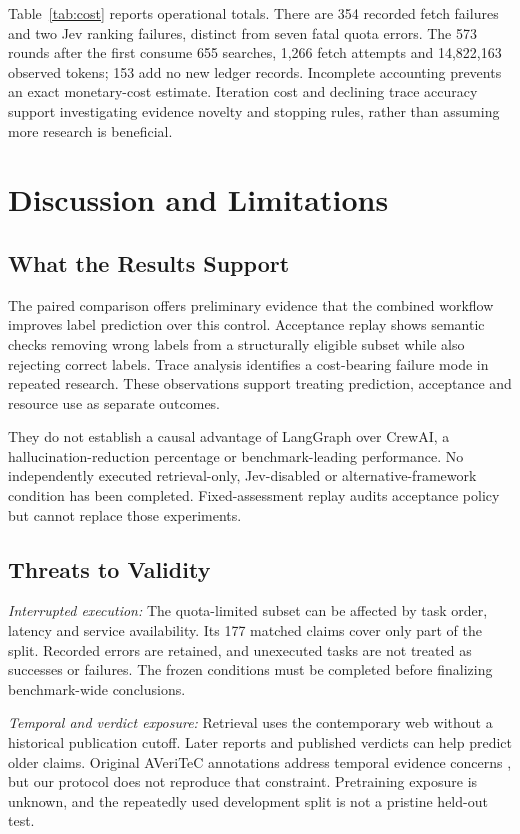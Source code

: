 \documentclass[conference]{IEEEtran}
\begin{document}
Table~\ref{tab:cost} reports operational totals. There are 354 recorded fetch failures and two Jev ranking failures, distinct from seven fatal quota errors. The 573 rounds after the first consume 655 searches, 1,266 fetch attempts and 14,822,163 observed tokens; 153 add no new ledger records. Incomplete accounting prevents an exact monetary-cost estimate. Iteration cost and declining trace accuracy support investigating evidence novelty and stopping rules, rather than assuming more research is beneficial.

\section{Discussion and Limitations}
\subsection{What the Results Support}
The paired comparison offers preliminary evidence that the combined workflow improves label prediction over this control. Acceptance replay shows semantic checks removing wrong labels from a structurally eligible subset while also rejecting correct labels. Trace analysis identifies a cost-bearing failure mode in repeated research. These observations support treating prediction, acceptance and resource use as separate outcomes.

They do not establish a causal advantage of LangGraph over CrewAI, a hallucination-reduction percentage or benchmark-leading performance. No independently executed retrieval-only, Jev-disabled or alternative-framework condition has been completed. Fixed-assessment replay audits acceptance policy but cannot replace those experiments.

\subsection{Threats to Validity}
\textit{Interrupted execution:} The quota-limited subset can be affected by task order, latency and service availability. Its 177 matched claims cover only part of the split. Recorded errors are retained, and unexecuted tasks are not treated as successes or failures. The frozen conditions must be completed before finalizing benchmark-wide conclusions.

\textit{Temporal and verdict exposure:} Retrieval uses the contemporary web without a historical publication cutoff. Later reports and published verdicts can help predict older claims. Original AVeriTeC annotations address temporal evidence concerns \cite{averitec}, but our protocol does not reproduce that constraint. Pretraining exposure is unknown, and the repeatedly used development split is not a pristine held-out test.
\end{document}
